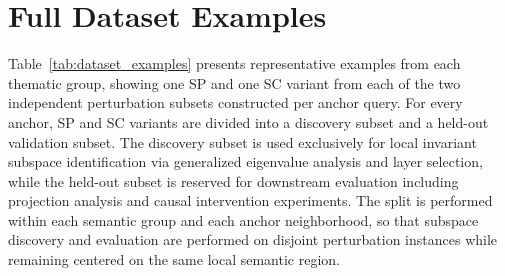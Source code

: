 


\section{Full Dataset Examples}
\label{app:expanded_data}

Table~\ref{tab:dataset_examples} presents representative examples from each thematic group, showing one SP and one SC variant from each of the two independent perturbation subsets constructed per anchor query. For every anchor, SP and SC variants are divided into a discovery subset and a held-out validation subset. The discovery subset is used exclusively for local invariant subspace identification via generalized eigenvalue analysis and layer selection, while the held-out subset is reserved for downstream evaluation including projection analysis and causal intervention experiments. The split is performed within each semantic group and each anchor neighborhood, so that subspace discovery and evaluation are performed on disjoint perturbation instances while remaining centered on the same local semantic region.


